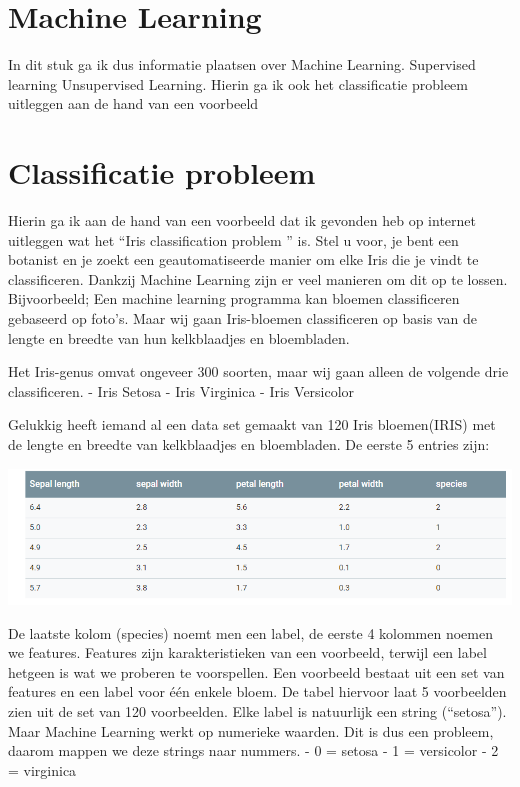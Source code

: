 \section {Machine Learning}
In dit stuk ga ik dus informatie plaatsen over Machine Learning. Supervised learning Unsupervised Learning. Hierin ga ik ook het classificatie probleem uitleggen aan de hand van een voorbeeld

\section{Classificatie probleem}
Hierin ga ik aan de hand van een voorbeeld dat ik gevonden heb op internet uitleggen wat het “Iris classification problem ” is. Stel u voor, je bent een botanist en je zoekt een geautomatiseerde manier om elke Iris die je vindt te classificeren. Dankzij Machine Learning zijn er veel manieren om dit op te lossen. Bijvoorbeeld; Een machine learning programma kan bloemen classificeren gebaseerd op foto’s. Maar wij gaan Iris-bloemen classificeren op basis van de lengte en breedte van hun kelkblaadjes en bloembladen.

Het Iris-genus omvat ongeveer 300 soorten, maar wij gaan alleen de volgende drie classificeren.\newline
- Iris Setosa \newline
- Iris Virginica \newline
- Iris Versicolor \newline 

Gelukkig heeft iemand al een data set gemaakt van 120 Iris bloemen(IRIS) met de lengte en breedte van kelkblaadjes en bloembladen. De eerste 5 entries zijn:

\includegraphics[scale=0.6]{img/iris}

De laatste kolom (species) noemt men een label, de eerste 4 kolommen noemen we features. Features zijn karakteristieken van een voorbeeld, terwijl een label hetgeen is wat we proberen te voorspellen. Een voorbeeld bestaat uit een set van features en een label voor één enkele bloem. De tabel hiervoor laat 5 voorbeelden zien uit de set van 120 voorbeelden.
Elke label is natuurlijk een string (“setosa”). Maar Machine Learning werkt op numerieke waarden. Dit is dus een probleem, daarom mappen we deze strings naar nummers.\newline
- 0 = setosa\newline
- 1 = versicolor\newline
- 2 = virginica\newline

